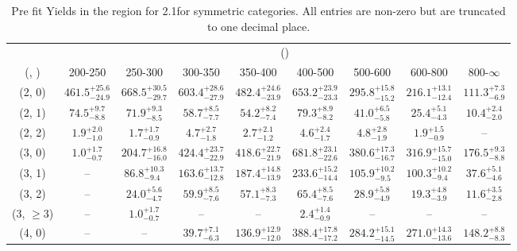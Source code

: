 \begin{table}[h!]
\tiny
\centering
\caption{Pre fit Yields in the \mj region for 2.1\ifb for symmetric categories. All entries are non-zero but are truncated to one decimal place.\label{tab:prednodatanaive_mu_comb_sym}}
\begin{tabular}
{ccccccccc}
	\hline\hline
	& \multicolumn{8}{c}{\scalht (\gev)} \\ 
	 (\njet,  \nb) & 200-250 & 250-300 & 300-350 & 350-400 & 400-500 & 500-600 & 600-800 & 800-$\infty$ \\ [0.8ex] 
\hline
	(2, 0) & $461.5^{+ 25.6 }_{- 24.9 }$ & $668.5^{+ 30.5 }_{- 29.7 }$ & $603.4^{+ 28.6 }_{- 27.9 }$ & $482.4^{+ 24.6 }_{- 23.9 }$ & $653.2^{+ 23.9 }_{- 23.3 }$ & $295.8^{+ 15.8 }_{- 15.2 }$ & $216.1^{+ 13.1 }_{- 12.4 }$ & $111.3^{+ 7.3 }_{- 6.9 }$ \\[0.5ex] 
	(2, 1) & $74.5^{+ 9.7 }_{- 8.8 }$ & $71.9^{+ 9.3 }_{- 8.5 }$ & $58.7^{+ 8.5 }_{- 7.7 }$ & $54.2^{+ 8.2 }_{- 7.4 }$ & $79.3^{+ 8.9 }_{- 8.2 }$ & $41.0^{+ 6.5 }_{- 5.8 }$ & $25.4^{+ 5.1 }_{- 4.3 }$ & $10.4^{+ 2.4 }_{- 2.0 }$ \\[0.5ex] 
	(2, 2) & $1.9^{+ 2.0 }_{- 1.0 }$ & $1.7^{+ 1.7 }_{- 0.9 }$ & $4.7^{+ 2.7 }_{- 1.8 }$ & $2.7^{+ 2.1 }_{- 1.2 }$ & $4.6^{+ 2.4 }_{- 1.7 }$ & $4.8^{+ 2.8 }_{- 1.9 }$ & $1.9^{+ 1.5 }_{- 0.9 }$ & -- \\[0.5ex] 
	(3, 0) & $1.0^{+ 1.7 }_{- 0.7 }$ & $204.7^{+ 16.8 }_{- 16.0 }$ & $424.4^{+ 23.7 }_{- 22.9 }$ & $418.6^{+ 22.7 }_{- 21.9 }$ & $681.8^{+ 23.1 }_{- 22.6 }$ & $380.6^{+ 17.3 }_{- 16.7 }$ & $316.9^{+ 15.7 }_{- 15.0 }$ & $176.5^{+ 9.3 }_{- 8.8 }$ \\[0.5ex] 
	(3, 1) & -- & $86.8^{+ 10.3 }_{- 9.4 }$ & $163.6^{+ 13.7 }_{- 12.8 }$ & $187.4^{+ 14.8 }_{- 13.9 }$ & $233.6^{+ 15.2 }_{- 14.4 }$ & $105.9^{+ 10.2 }_{- 9.5 }$ & $100.3^{+ 10.2 }_{- 9.4 }$ & $37.6^{+ 5.1 }_{- 4.6 }$ \\[0.5ex] 
	(3, 2) & -- & $24.0^{+ 5.6 }_{- 4.7 }$ & $59.9^{+ 8.5 }_{- 7.6 }$ & $57.1^{+ 8.3 }_{- 7.3 }$ & $65.4^{+ 8.5 }_{- 7.6 }$ & $28.9^{+ 5.8 }_{- 4.9 }$ & $19.3^{+ 4.8 }_{- 3.9 }$ & $11.6^{+ 3.5 }_{- 2.8 }$ \\[0.5ex] 
	(3, $\ge3$) & -- & $1.0^{+ 1.7 }_{- 0.7 }$ & -- & -- & $2.4^{+ 1.4 }_{- 0.9 }$ & -- & -- & -- \\[0.5ex] 
	(4, 0) & -- & -- & $39.7^{+ 7.1 }_{- 6.3 }$ & $136.9^{+ 12.9 }_{- 12.0 }$ & $388.4^{+ 17.8 }_{- 17.2 }$ & $284.2^{+ 15.1 }_{- 14.5 }$ & $271.0^{+ 14.3 }_{- 13.6 }$ & $148.2^{+ 8.8 }_{- 8.3 }$ \\[0.5ex] 

\end{tabular}
\end{table}
